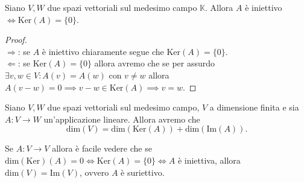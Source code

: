 \documentclass[12pt, twoside, italian, openany]{book}
\begin{document}
	\begin{prop}
		Siano $V, W$ due spazi vettoriali sul medesimo campo $\mathbb{K}$. Allora $A$ è iniettivo $\iff \text{Ker}(A) = \{ 0 \}$.
	\end{prop}
	\begin{proof} \hspace{1cm} \\
		$\boxed{\Rightarrow}$: se $A$ è iniettivo chiaramente segue che $\text{Ker}(A) = \{ 0 \}$. \\
		$\boxed{\Leftarrow}$: se $\text{Ker}(A) = \{ 0 \}$ allora avremo che se per assurdo $\exists v, w \in V : A(v) = A(w)$ con $v \neq w$ allora $A(v - w) = 0 \implies v - w \in \text{Ker}(A) \implies v = w$.
	\end{proof}
	\begin{theorem}
		Siano $V, W$ due spazi vettoriali sul medesimo campo, $V$ a dimensione finita e sia $A: V \to W$ un'applicazione lineare. Allora avremo che
		$$
		\text{dim}(V) = \text{dim}(\text{Ker}(A)) + \text{dim}(\text{Im}(A)).
		$$
	\end{theorem}
	\begin{remark}
		Se $A: V \to V$ allora è facile vedere che se $\text{dim}(\text{Ker})(A) = 0 \iff \text{Ker}(A) = \{ 0 \} \iff A$ è iniettiva, allora $\text{dim}(V) = \text{Im}(V)$, ovvero $A$ è suriettivo.
	\end{remark}
\end{document}
